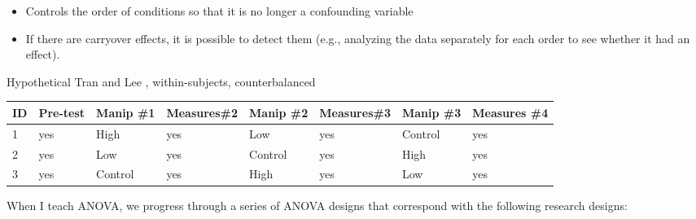 \documentclass[
  english,
]{book}
\providecommand{\tightlist}{%
  \setlength{\itemsep}{0pt}\setlength{\parskip}{0pt}}
\begin{document}
\begin{itemize}
\tightlist
\item
  Controls the order of conditions so that it is no longer a confounding variable
\item
  If there are carryover effects, it is possible to detect them (e.g., analyzing the data separately for each order to see whether it had an effect).
\end{itemize}

Hypothetical Tran and Lee \citeyearpar{tran_you_2014}, within-subjects, counterbalanced

\begin{longtable}[]{@{}llllllll@{}}
\toprule
ID & Pre-test & Manip \#1 & Measures\#2 & Manip \#2 & Measures\#3 & Manip \#3 & Measures \#4\tabularnewline
\midrule
\endhead
1 & yes & High & yes & Low & yes & Control & yes\tabularnewline
2 & yes & Low & yes & Control & yes & High & yes\tabularnewline
3 & yes & Control & yes & High & yes & Low & yes\tabularnewline
\bottomrule
\end{longtable}

When I teach ANOVA, we progress through a series of ANOVA designs that correspond with the following research designs:
\end{document}
